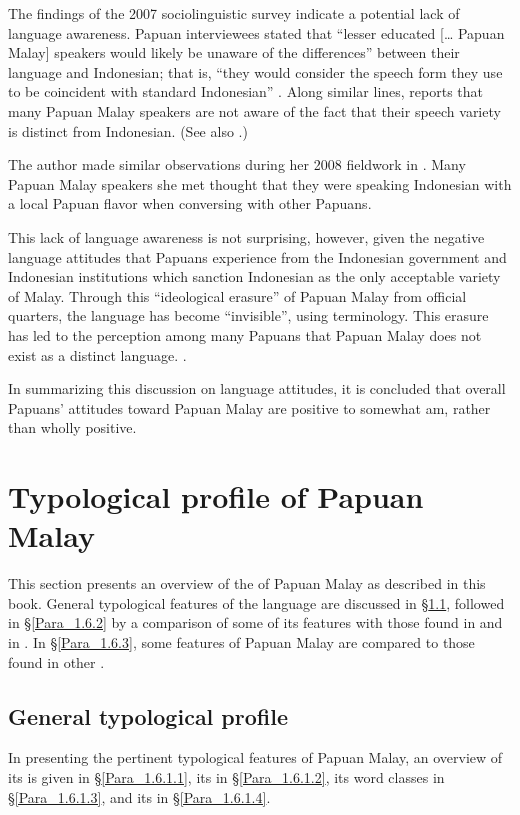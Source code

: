 The findings of the 2007 sociolinguistic survey indicate a potential lack of language awareness. Papuan interviewees stated that  ``lesser educated [{\ldots} Papuan Malay] speakers would likely be unaware of the differences'' between their language and Indonesian; that is,  ``they would consider the speech form they use to be coincident with standard Indonesian'' \citep[11]{Scott.2008}. Along similar lines, {\citet[76]{Paauw.2009}} reports that many Papuan Malay speakers are not aware of the fact that their speech variety is distinct from Indonesian. (See also \citealt[5--7]{Burung.2008}.)



The author made similar observations during her 2008 fieldwork in . Many Papuan Malay speakers she met thought that they were speaking Indonesian with a local Papuan flavor when conversing with other Papuans.



This lack of language awareness is not surprising, however, given the negative language attitudes that Papuans experience from the Indonesian government and Indonesian institutions which sanction Indonesian as the only acceptable variety of Malay. Through this  ``ideological erasure'' of Papuan Malay from official quarters, the language has become  ``invisible'', using   terminology. This erasure has led to the perception among many Papuans that Papuan Malay does not exist as a distinct language. \citep[See also][30]{Errington.2001}.



In summarizing this discussion on language attitudes, it is concluded that overall Papuans’ attitudes toward Papuan Malay are positive to somewhat am, rather than wholly positive.


\section{Typological profile of Papuan Malay}
\label{Para_1.6}
This section presents an overview of the  of Papuan Malay as described in this book. General typological features of the language are discussed in §\ref{Para_1.6.1}, followed in §\ref{Para_1.6.2} by a comparison of some of its features with those found in  and in . In §\ref{Para_1.6.3}, some features of Papuan Malay are compared to those found in other .


\subsection{General typological profile}\label{Para_1.6.1}
\largerpage
In presenting the pertinent typological features of Papuan Malay, an overview of its  is given in §\ref{Para_1.6.1.1}, its  in §\ref{Para_1.6.1.2}, its word classes in §\ref{Para_1.6.1.3}, and its  in §\ref{Para_1.6.1.4}.

